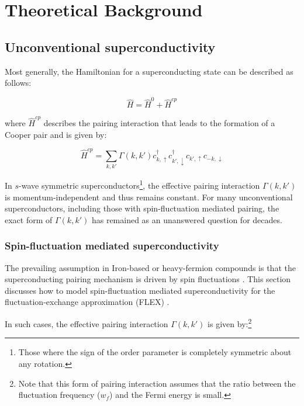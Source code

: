 \documentclass[11pt]{article}
\begin{document}
\section{Theoretical Background}

\subsection{Unconventional superconductivity}

\noindent Most generally, the Hamiltonian for a superconducting state can be described as follows:

\begin{equation}\label{General Hamiltonian}
    \hat{H} = \hat{H}^0 + \hat{H}^{cp}
\end{equation}

\noindent where $\hat{H}^{cp}$ describes the pairing interaction that leads to the formation of a Cooper pair and is given by:

\begin{equation}\label{Hcp}
    \hat{H}^{cp} = \sum_{k,k'} \Gamma(k, k') c^{\dagger}_{k, \uparrow}  c^{\dagger}_{k', \downarrow} c_{k', \uparrow}c_{-k, \downarrow}
\end{equation}

\noindent In $s$-wave symmetric superconductors\footnote{Those where the sign of the order parameter is completely symmetric about any rotation.}, the effective pairing interaction $\Gamma(k,k')$ is momentum-independent and thus remains constant. 
For many unconventional superconductors, including those with spin-fluctuation mediated pairing, the exact form of $\Gamma(k,k')$ has remained as an unanswered question for decades. 
\subsubsection{Spin-fluctuation mediated superconductivity}
\label{subsec:spinfluct}

The prevailing assumption in Iron-based or heavy-fermion compounds 
is that the superconducting pairing mechanism is driven by spin fluctuations \cite{moriya2000spin}. This section discusses how to
model spin-fluctuation mediated superconductivity for the fluctuation-exchange approximation (FLEX) \cite{esirgen1997fluctuation}. \par
\medskip
\noindent In such cases, the effective pairing interaction $\Gamma(k,k')$ is given by:\footnote{Note that this form of pairing interaction 
assumes that the ratio between
the fluctuation frequency ($w_f$) and the Fermi energy is small.}
\end{document}
